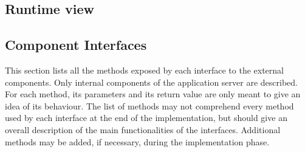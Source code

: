 \documentclass[10pt]{article} %
\begin{document}
\subsection{Runtime view}
\subsection{Component Interfaces}
This section lists all the methods exposed by each interface to the external components. Only internal components of the application server are described.
For each method, its parameters and its return value are only meant to give an idea of its behaviour. The list of methods may not comprehend every method
used by each interface at the end of the implementation, but should give an overall description of the main functionalities of the interfaces. Additional methods
may be added, if necessary, during the implementation phase.
\end{document}

